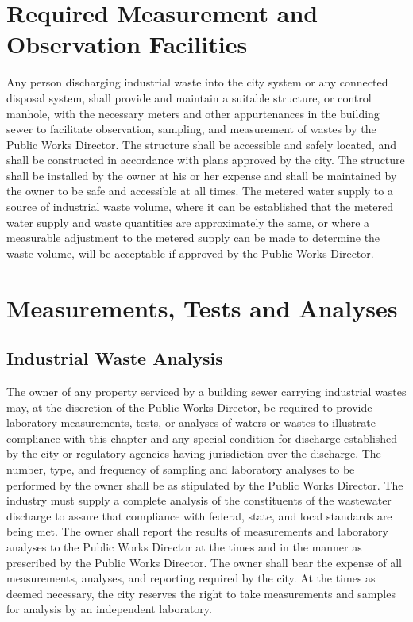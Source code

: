 
\setcounter{section}{34}
\section{Required Measurement and Observation Facilities}
Any person discharging industrial waste into the city system or any connected disposal system, shall provide and maintain a suitable structure, or control manhole, with the necessary meters and other appurtenances in the building sewer to facilitate observation, sampling, and measurement of wastes by the Public Works Director. The structure shall be accessible and safely located, and shall be constructed in accordance with plans approved by the city. The structure shall be installed by the owner at his or her expense and shall be maintained by the owner to be safe and accessible at all times. The metered water supply to a source of industrial waste volume, where it can be established that the metered water supply and waste quantities are approximately the same, or where a measurable adjustment to the metered supply can be made to determine the waste volume, will be acceptable if approved by the Public Works Director.

\section{Measurements, Tests and Analyses}
\subsection{Industrial Waste Analysis}
The owner of any property serviced by a building sewer carrying industrial wastes may, at the discretion of the Public Works Director, be required to provide laboratory measurements, tests, or analyses of waters or wastes to illustrate compliance with this chapter and any special condition for discharge established by the city or regulatory agencies having jurisdiction over the discharge.  The number, type, and frequency of sampling and laboratory analyses to be performed by the owner shall be as stipulated by the Public Works Director.  The industry must supply a complete analysis of the constituents of the wastewater discharge to assure that compliance with federal, state, and local standards are being met.  The owner shall report the results of measurements and laboratory analyses to the Public Works Director at the times and in the manner as prescribed by the Public Works Director.  The owner shall bear the expense of all measurements, analyses, and reporting required by the city.  At the times as deemed necessary, the city reserves the right to take measurements and samples for analysis by an independent laboratory.
